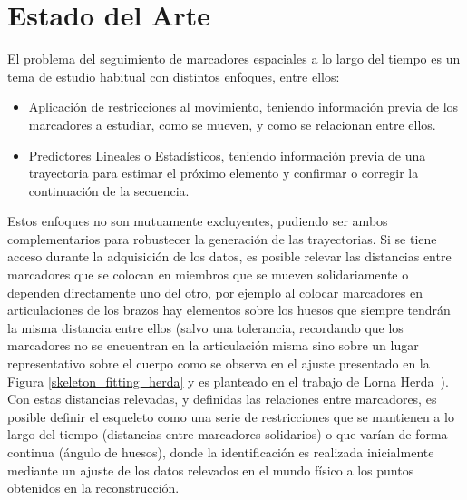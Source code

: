 \section{Estado del Arte}

El problema del seguimiento de marcadores espaciales a lo largo del tiempo es un tema de estudio habitual con distintos enfoques, entre ellos:

\begin{itemize}

\item Aplicación de restricciones al movimiento, teniendo información previa de los marcadores a estudiar, como se mueven, y como se relacionan entre ellos. 

\item Predictores Lineales o Estadísticos, teniendo información previa de una trayectoria para estimar el próximo elemento y confirmar o corregir la continuación de la secuencia.

\end{itemize}

Estos enfoques no son mutuamente excluyentes, pudiendo ser ambos complementarios para robustecer la generación de las trayectorias. Si se tiene acceso durante la adquisición de los datos, es posible relevar las distancias entre marcadores que se colocan en miembros que se mueven solidariamente  o dependen directamente uno del otro, por ejemplo al colocar marcadores en articulaciones de los brazos hay elementos sobre los huesos que siempre tendrán la misma distancia entre ellos (salvo una tolerancia, recordando que los marcadores no se encuentran en la articulación misma sino sobre un lugar representativo sobre el cuerpo como se observa en el ajuste presentado en la Figura \ref{skeleton_fitting_herda} y es planteado en el trabajo de Lorna Herda~\cite{herda}). Con estas distancias relevadas, y definidas las relaciones entre marcadores, es posible definir el esqueleto como una serie de restricciones que se mantienen a lo largo del tiempo (distancias entre marcadores solidarios) o que varían de forma continua (ángulo de huesos), donde la identificación es realizada inicialmente mediante un ajuste de los datos relevados en el mundo físico a los puntos obtenidos en la reconstrucción. 

